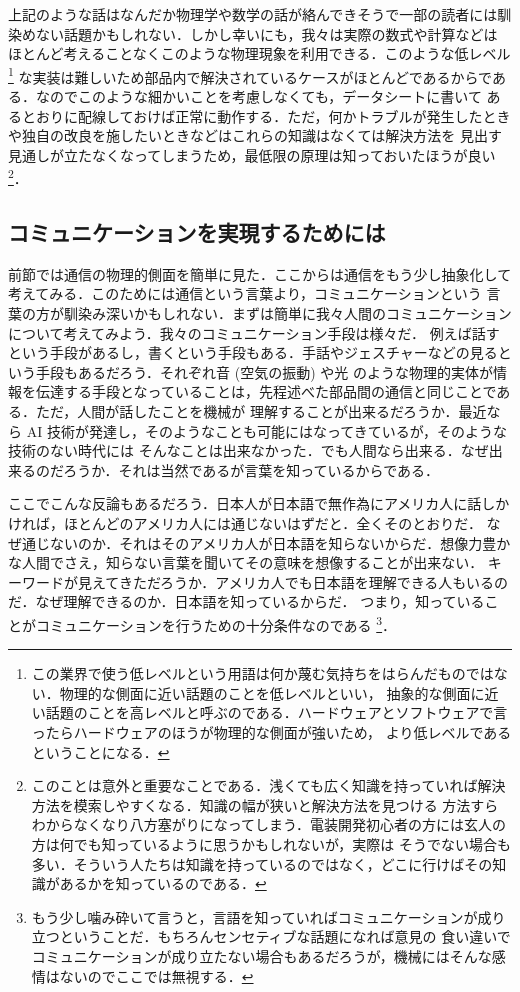 \documentclass[dvipdfmx]{jsbook}
\begin{document}
  上記のような話はなんだか物理学や数学の話が絡んできそうで一部の読者には馴染めない話題かもしれない．しかし幸いにも，我々は実際の数式や計算などは
  ほとんど考えることなくこのような物理現象を利用できる．このような低レベル
  \footnote{この業界で使う低レベルという用語は何か蔑む気持ちをはらんだものではない．物理的な側面に近い話題のことを低レベルといい，
  抽象的な側面に近い話題のことを高レベルと呼ぶのである．ハードウェアとソフトウェアで言ったらハードウェアのほうが物理的な側面が強いため，
  より低レベルであるということになる．}
  な実装は難しいため部品内で解決されているケースがほとんどであるからである．なのでこのような細かいことを考慮しなくても，データシートに書いて
  あるとおりに配線しておけば正常に動作する．ただ，何かトラブルが発生したときや独自の改良を施したいときなどはこれらの知識はなくては解決方法を
  見出す見通しが立たなくなってしまうため，最低限の原理は知っておいたほうが良い
  \footnote{このことは意外と重要なことである．浅くても広く知識を持っていれば解決方法を模索しやすくなる．知識の幅が狭いと解決方法を見つける
  方法すらわからなくなり八方塞がりになってしまう．電装開発初心者の方には玄人の方は何でも知っているように思うかもしれないが，実際は
  そうでない場合も多い．そういう人たちは知識を持っているのではなく，どこに行けばその知識があるかを知っているのである．}．

\subsection{コミュニケーションを実現するためには}

  前節では通信の物理的側面を簡単に見た．ここからは通信をもう少し抽象化して考えてみる．このためには通信という言葉より，コミュニケーションという
  言葉の方が馴染み深いかもしれない．まずは簡単に我々人間のコミュニケーションについて考えてみよう．我々のコミュニケーション手段は様々だ．
  例えば話すという手段があるし，書くという手段もある．手話やジェスチャーなどの見るという手段もあるだろう．それぞれ音 (空気の振動) や光
  のような物理的実体が情報を伝達する手段となっていることは，先程述べた部品間の通信と同じことである．ただ，人間が話したことを機械が
  理解することが出来るだろうか．最近なら AI 技術が発達し，そのようなことも可能にはなってきているが，そのような技術のない時代には
  そんなことは出来なかった．でも人間なら出来る．なぜ出来るのだろうか．それは当然であるが言葉を知っているからである．

  ここでこんな反論もあるだろう．日本人が日本語で無作為にアメリカ人に話しかければ，ほとんどのアメリカ人には通じないはずだと．全くそのとおりだ．
  なぜ通じないのか．それはそのアメリカ人が日本語を知らないからだ．想像力豊かな人間でさえ，知らない言葉を聞いてその意味を想像することが出来ない．
  キーワードが見えてきただろうか．アメリカ人でも日本語を理解できる人もいるのだ．なぜ理解できるのか．日本語を知っているからだ．
  つまり，知っていることがコミュニケーションを行うための十分条件なのである
  \footnote{もう少し噛み砕いて言うと，言語を知っていればコミュニケーションが成り立つということだ．もちろんセンセティブな話題になれば意見の
  食い違いでコミュニケーションが成り立たない場合もあるだろうが，機械にはそんな感情はないのでここでは無視する．}．
\end{document}
